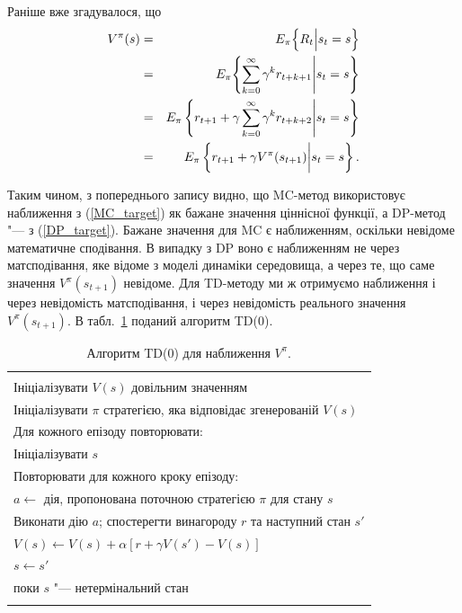 Раніше вже згадувалося, що
\begin{eqnarray}
V^\pi(s) & = & E_\pi \Bigl\{R_t \Big| s_t = s \Bigr\} \label{MC_target}\\
			& = & E_\pi \Biggl\{\sum_{k=0}^{\infty}\gamma^k r_{t+k+1} \Bigg| s_t = s \Biggr\} \nonumber\\
			& = & E_\pi \left\{r_{t+1} + \gamma\sum_{k=0}^{\infty}\gamma^k r_{t+k+2} \Bigg| s_t = s \right\} \nonumber\\
			& = & E_\pi \left\{r_{t+1} + \gamma V^\pi(s_{t+1}) \bigg| s_t = s \right\}.\label{DP_target}
\end{eqnarray}

Таким чином, з попереднього запису видно, що MC-метод використовує наближення з (\ref{MC_target}) як бажане значення ціннісної функції, а DP-метод "--- з (\ref{DP_target}). Бажане значення для MC є наближенням, оскільки невідоме математичне сподівання. В випадку з DP воно є наближенням не через матсподівання, яке відоме з моделі динаміки середовища, а через те, що саме значення $V^\pi(s_{t+1})$ невідоме. Для TD-методу ми ж отримуємо наближення і через невідомість матсподівання, і через невідомість реального значення $V^\pi(s_{t+1})$. В табл.~\ref{TD0_algorithm} поданий алгоритм TD(0).

\begin{table}
\centering
\label{TD0_algorithm}
\begin{tabular}{|l|}
\hline\\
Ініціалізувати $V(s)$ довільним значенням\\
Ініціалізувати $\pi$ стратегією, яка відповідає згенерованій $V(s)$\\
Для кожного епізоду повторювати:\\
\hspace{0.5cm} Ініціалізувати $s$\\
\hspace{0.5cm} Повторювати для кожного кроку епізоду:\\
\hspace{1cm} 	$a \leftarrow $ дія, пропонована поточною стратегією $\pi$ для стану $s$\\
\hspace{1cm} 	Виконати дію $a$; спостерегти винагороду $r$ та наступний стан $s'$\\
\hspace{1cm} 	$V(s) \leftarrow V(s) + \alpha\left[r + \gamma V(s') - V(s)\right]$\\
\hspace{1cm} 	$s \leftarrow s'$\\
\hspace{0.5cm} поки $s$ "--- нетермінальний стан\\
\\
\hline
\end{tabular}
\caption{Алгоритм TD(0) для наближення $V^\pi$.}
\end{table}

